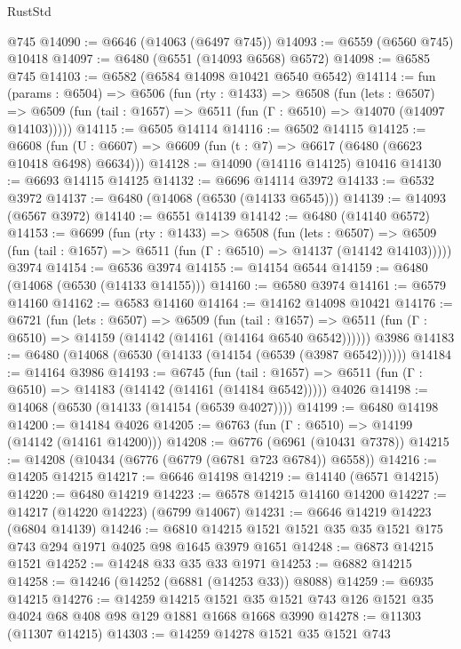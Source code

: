 \begin{lexlean}{RustStd}
\begin{coremodule}
    @745
@14090 := @6646 (@14063 (@6497 @745))
@14093 := @6559 (@6560 @745) @10418
@14097 := @6480 (@6551 (@14093 @6568) @6572)
@14098 := @6585 @745
@14103 := @6582 (@6584 @14098 @10421 @6540 @6542)
@14114 := fun (params : @6504) =>
  @6506
    (fun (rty : @1433) =>
    @6508
      (fun (lets : @6507) =>
      @6509 (fun (tail : @1657) => @6511 (fun (Γ : @6510) => @14070 (@14097 @14103)))))
@14115 := @6505 @14114
@14116 := @6502 @14115
@14125 := @6608
    (fun (U : @6607) => @6609 (fun (t : @7) => @6617 (@6480 (@6623 @10418 @6498) @6634)))
@14128 := @14090 (@14116 @14125) @10416
@14130 := @6693 @14115 @14125
@14132 := @6696 @14114 @3972
@14133 := @6532 @3972
@14137 := @6480 (@14068 (@6530 (@14133 @6545)))
@14139 := @14093 (@6567 @3972)
@14140 := @6551 @14139
@14142 := @6480 (@14140 @6572)
@14153 := @6699
    (fun (rty : @1433) =>
    @6508
      (fun (lets : @6507) =>
      @6509 (fun (tail : @1657) => @6511 (fun (Γ : @6510) => @14137 (@14142 @14103)))))
    @3974
@14154 := @6536 @3974
@14155 := @14154 @6544
@14159 := @6480 (@14068 (@6530 (@14133 @14155)))
@14160 := @6580 @3974
@14161 := @6579 @14160
@14162 := @6583 @14160
@14164 := @14162 @14098 @10421
@14176 := @6721
    (fun (lets : @6507) =>
    @6509
      (fun (tail : @1657) =>
      @6511 (fun (Γ : @6510) => @14159 (@14142 (@14161 (@14164 @6540 @6542))))))
    @3986
@14183 := @6480 (@14068 (@6530 (@14133 (@14154 (@6539 (@3987 @6542))))))
@14184 := @14164 @3986
@14193 := @6745
    (fun (tail : @1657) => @6511 (fun (Γ : @6510) => @14183 (@14142 (@14161 (@14184 @6542)))))
    @4026
@14198 := @14068 (@6530 (@14133 (@14154 (@6539 @4027))))
@14199 := @6480 @14198
@14200 := @14184 @4026
@14205 := @6763 (fun (Γ : @6510) => @14199 (@14142 (@14161 @14200)))
@14208 := @6776 (@6961 (@10431 @7378))
@14215 := @14208 (@10434 (@6776 (@6779 (@6781 @723 @6784)) @6558))
@14216 := @14205 @14215
@14217 := @6646 @14198
@14219 := @14140 (@6571 @14215)
@14220 := @6480 @14219
@14223 := @6578 @14215 @14160 @14200
@14227 := @14217 (@14220 @14223) (@6799 @14067)
@14231 := @6646 @14219 @14223 (@6804 @14139)
@14246 := @6810 @14215 @1521 @1521 @35 @35 @1521 @175 @743 @294 @1971 @4025 @98 @1645 @3979 @1651
@14248 := @6873 @14215 @1521
@14252 := @14248 @33 @35 @33 @1971
@14253 := @6882 @14215
@14258 := @14246 (@14252 (@6881 (@14253 @33)) @8088)
@14259 := @6935 @14215
@14276 := @14259
    @14215
    @1521
    @35
    @1521
    @743
    @126
    @1521
    @35
    @4024
    @68
    @408
    @98
    @129
    @1881
    @1668
    @1668
    @3990
@14278 := @11303 (@11307 @14215)
@14303 := @14259
    @14278
    @1521
    @35
    @1521
    @743

\end{coremodule}
\end{lexlean}

